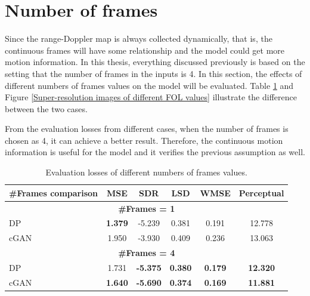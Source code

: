 \section{Number of frames} \label{FOL comparison}
Since the range-Doppler map is always collected dynamically, that is, the continuous frames will have some relationship and the model could get more motion information. In this thesis, everything discussed previously is based on the setting that the number of frames in the inputs is 4. In this section, the effects of different numbers of frames values on the model will be evaluated. Table \ref{Evaluation losses of FOL comparison} and Figure \ref{Super-resolution images of different FOL values} illustrate the difference between the two cases.

From the evaluation losses from different cases, when the number of frames is chosen as 4, it can achieve a better result. Therefore, the continuous motion information is useful for the model and it verifies the previous assumption as well.

\begin{table}[!htp]
    \centering
    \caption{Evaluation losses of different numbers of frames values.}
    \label{Evaluation losses of FOL comparison}
    \begin{tabular}{l|c|c|c|c|c}
        \hline
        \#Frames comparison & MSE & SDR & LSD & WMSE & Perceptual \\
        \hline
        \multicolumn{6}{c}{\textbf{\#Frames = 1}}\\
        \hline
        DP & \textbf{1.379} & -5.239 & 0.381 & 0.191 & 12.778 \\
        \hline
        cGAN & 1.950 & -3.930 & 0.409 & 0.236 & 13.063 \\
        \hline
        \multicolumn{6}{c}{\textbf{\#Frames = 4}}\\
        \hline
        DP & 1.731 & \textbf{-5.375} & \textbf{0.380} & \textbf{0.179} & \textbf{12.320} \\
        \hline
        cGAN & \textbf{1.640} & \textbf{-5.690} & \textbf{0.374} & \textbf{0.169} & \textbf{11.881} \\
        \hline
    \end{tabular}
\end{table}

